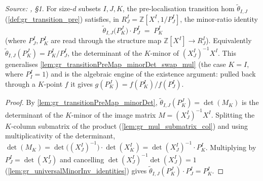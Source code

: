 \begin{lemma}\leanok
  \label{lem:gr_transitionPreMap_minorDet_mul}
  \textit{Source: \cite{nitsure-hilbert-quot}, \S 1.}
  For size-\(d\) subsets \(I, J, K\), the pre-localisation transition hom
  \(\tilde\theta_{I,J}\) (\cref{def:gr_transition_pre}) satisfies, in \(R^I_J =
  \mathbb{Z}[X^I, 1/P^I_J]\), the minor-ratio identity
  \[
    \tilde\theta_{I,J}\bigl(P^J_K\bigr)\cdot P^I_J \;=\; P^I_K
  \]
  (where \(P^I_J, P^I_K\) are read through the structure map \(\mathbb{Z}[X^I] \to
  R^I_J\)). Equivalently \(\tilde\theta_{I,J}(P^J_K) = P^I_K / P^I_J\), the
  determinant of the \(K\)-minor of \((X^I_J)^{-1} X^I\). This generalises
  \cref{lem:gr_transitionPreMap_minorDet_swap_mul} (the case \(K = I\), where
  \(P^I_I = 1\)) and is the algebraic engine of the existence argument: pulled back
  through a \(K\)-point \(f\) it gives \(g(P^J_K) = f(P^I_K)/f(P^I_J)\).
\end{lemma}
\begin{proof}
    \leanok
  By \cref{lem:gr_transitionPreMap_minorDet}, \(\tilde\theta_{I,J}(P^J_K) =
  \det(M_K)\) is the determinant of the \(K\)-minor of the image matrix \(M =
  (X^I_J)^{-1} X^I\). Splitting the \(K\)-column submatrix of the product
  (\cref{lem:gr_mul_submatrix_col}) and using multiplicativity of the determinant,
  \(\det(M_K) = \det\bigl((X^I_J)^{-1}\bigr)\cdot \det(X^I_K) =
  \det(X^I_J)^{-1}\cdot P^I_K\). Multiplying by \(P^I_J = \det(X^I_J)\) and
  cancelling \(\det(X^I_J)^{-1}\det(X^I_J) = 1\)
  (\cref{lem:gr_universalMinorInv_identities}) gives
  \(\tilde\theta_{I,J}(P^J_K)\cdot P^I_J = P^I_K\).
\end{proof}

